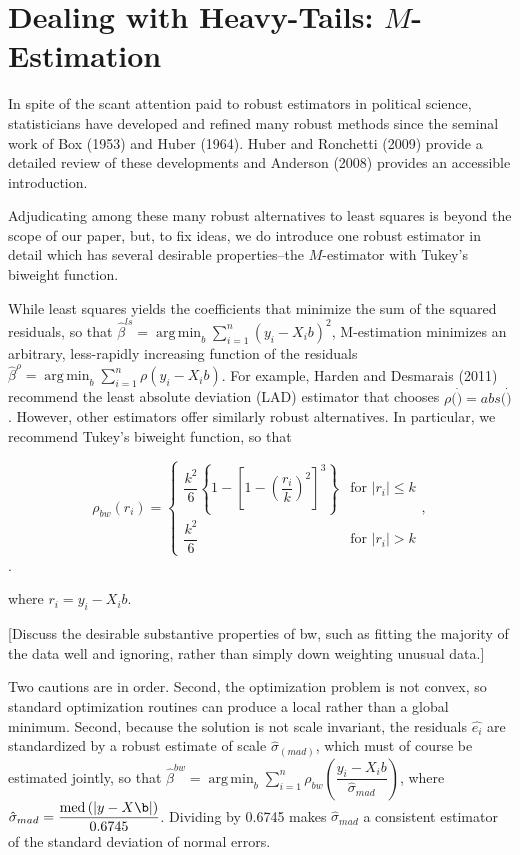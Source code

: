 \documentclass[10pt]{article}
\DeclareMathOperator*{\argmin}{arg\,min}
\DeclareMathOperator{\med}{med}
\begin{document}
\section*{Dealing with Heavy-Tails: $M$-Estimation}

In spite of the scant attention paid to robust estimators in political science, statisticians have developed and refined many robust methods since the seminal work of Box (1953) and Huber (1964). Huber and Ronchetti (2009) provide a detailed review of these developments and Anderson (2008) provides an accessible introduction. 

Adjudicating among these many robust alternatives to least squares is beyond the scope of our paper, but, to fix ideas, we do introduce one robust estimator in detail which has several desirable properties--the $M$-estimator with Tukey's biweight function. 

While least squares yields the coefficients that minimize the sum of the squared residuals, so that $\hat{\beta}^{ls} =\argmin_{b} \sum_{i = 1}^n (y_i - X_ib)^2$, M-estimation minimizes an arbitrary, less-rapidly increasing function of the residuals $\hat{\beta}^{\rho} =\argmin_{b} \sum_{i = 1}^n \rho(y_i - X_ib)$. For example, Harden and Desmarais (2011) recommend the least absolute deviation (LAD) estimator that chooses $\rho(\dot) = abs(\dot)$. However, other estimators offer similarly robust alternatives. In particular, we recommend Tukey's biweight function, so that

\begin{displaymath}
   \rho_{bw}(r_i) = \left\{
     \begin{array}{lr}
       \dfrac{k^2}{6}\left\{ 1 - \left[ 1 - \left( \dfrac{r_i}{k} \right)^2 \right]^3\right\} & \text{for } |r_i| \leq k\\
	\dfrac{k^2}{6} & \text{for } |r_i| > k 
\end{array}
   \right.,
\end{displaymath}.

where $r_i = y_i - X_ib$.

[Discuss the desirable substantive properties of bw, such as fitting the majority of the data well and ignoring, rather than simply down weighting unusual data.]

Two cautions are in order. Second, the optimization problem is not convex, so standard optimization routines can produce a local rather than a global minimum. Second, because the solution is not scale invariant, the residuals $\hat{e_i}$ are standardized by a robust estimate of scale $\hat{\sigma}_{(mad)}$, which must of course be estimated jointly, so that $\hat{\beta}^{bw} =\argmin_{b} \sum_{i = 1}^n \rho_{bw}\left(\dfrac{y_i - X_ib}{\hat{\sigma}_{mad}}\right)$, where $\hat{\sigma}_{mad} = \dfrac{\med\left( |y - X\b|\right)}{0.6745}$. Dividing by 0.6745 makes $\hat{\sigma}_{mad}$ a consistent estimator of the standard deviation of normal errors.
\end{document}
